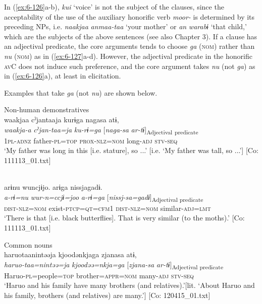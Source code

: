 \begin{styleBeschriftung}
In (\ref{ex:6-126}a-b), \textit{kui} ‘voice’ is not the subject of the clauses, since the acceptability of the use of the auxiliary honorific verb \textit{moor-} is determined by its preceding NPs, i.e. \textit{naakjaa} \textit{anmaa-taa} ‘your mother’ or \textit{an} \textit{warabɨ} ‘that child,’ which are the subjects of the above sentences (see also Chapter 3). If a clause has an adjectival predicate, the core arguments tends to choose \textit{ga} (\textsc{nom}) rather than \textit{nu} (\textsc{nom}) as in (\ref{ex:6-127}a-d). However, the adjectival predicate in the honorific \textsc{av}C does not induce such preference, and the core argument takes \textit{nu} (not \textit{ga}) as in (\ref{ex:6-126}a), at least in elicitation.

Examples that take \textit{ga} (not \textit{nu}) are shown below.

\ea\label{ex:6-127}
 Non-human demonstratives\\
 \ea {\TM}  waakjaa  cˀjantaaja  kurɨga  nagasa  atɨ,\\
\glll \textit{waakja-a}  \textit{cˀjan-taa=ja}  \textit{ku-rɨ=ga}  [\textit{naga-sa}  \textit{ar-tɨ}]\textsubscript{Adjectival} \textsubscript{predicate}\\
1\textsc{pl}-\textsc{adnz}  father-\textsc{pl}=\textsc{top}  \textsc{prox}-\textsc{nlz}=\textsc{nom}  long-\textsc{adj}  \textsc{stv}-\textsc{seq}\\
\glt ‘My father was long in this [i.e. stature], so ...’ [i.e. ‘My father was tall, so ...’]      [Co: 111113\_01.txt]
\z

\ex{}\\
{\TM}
\glll  arɨnu  wuncjɨjo.  arɨga     nissjagadɨ.\\
\textit{a-rɨ=nu}  \textit{wur-n=ccjɨ=joo}  \textit{a-rɨ=ga}  [\textit{nissj-sa=gadɨ}]\textsubscript{Adjectival predicate}\\
\textsc{dist}-\textsc{nlz}=\textsc{nom}  exist-\textsc{ptcp}=\textsc{qt}=\textsc{cfm}1  \textsc{dist}-\textsc{nlz}=\textsc{nom}  similar-\textsc{adj}=\textsc{lmt}\\
\glt ‘There is that [i.e. black butterflies]. That is very similar (to the moths).’ [Co: 111113\_01.txt]
\z

  Common nouns\\

\ex
{\TM}
\glll haruotaanintəəja  kjoodənkjaga  zjanasa  atɨ,\\
\textit{haruo-taa=nintəə=ja}  \textit{kjoodəə=nkja=ga}  [\textit{zjana-sa}  \textit{ar-tɨ}]\textsubscript{Adjectival predicate}\\
Haruo-\textsc{pl}=people=\textsc{top}  brother=\textsc{appr}=\textsc{nom}  many-\textsc{adj}  \textsc{stv}-\textsc{seq}\\
\glt ‘Haruo and his family have many brothers (and relatives).’[lit. ‘About Haruo and his family, brothers (and relatives) are many.’]      [Co: 120415\_01.txt]
\z


\end{styleBeschriftung}
